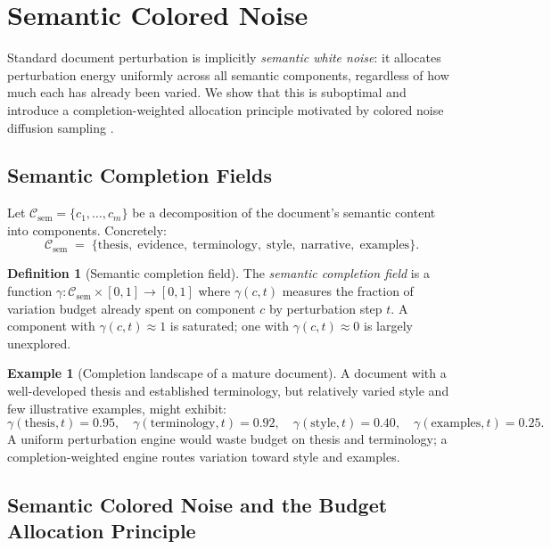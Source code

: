 \documentclass[12pt, a4paper]{article}
\theoremstyle{plain}
\theoremstyle{definition}
\newtheorem{definition}[theorem]{Definition}
\newtheorem{example}[theorem]{Example}
\theoremstyle{remark}
\begin{document}
\section{Semantic Colored Noise}
\label{sec:colorednoise}

Standard document perturbation is implicitly \emph{semantic white noise}: it
allocates perturbation energy uniformly across all semantic components,
regardless of how much each has already been varied.  We show that this
is suboptimal and introduce a completion-weighted allocation principle
motivated by colored noise diffusion sampling
\cite{davidson2026colorednoisediffusionsampling}.

\subsection{Semantic Completion Fields}

Let $\mathcal{C}_{\mathrm{sem}} = \{c_1, \ldots, c_m\}$ be a decomposition of
the document's semantic content into components.  Concretely:
\[
   \mathcal{C}_{\mathrm{sem}} \;=\;
   \{\text{thesis},\; \text{evidence},\; \text{terminology},\;
     \text{style},\; \text{narrative},\; \text{examples}\}.
\]

\begin{definition}[Semantic completion field]
\label{def:completion}
The \emph{semantic completion field} is a function
$\gamma : \mathcal{C}_{\mathrm{sem}} \times [0,1] \to [0,1]$
where $\gamma(c, t)$ measures the fraction of variation budget already spent
on component $c$ by perturbation step $t$.  A component with
$\gamma(c, t) \approx 1$ is saturated; one with $\gamma(c, t) \approx 0$ is
largely unexplored.
\end{definition}

\begin{example}[Completion landscape of a mature document]
A document with a well-developed thesis and established terminology, but
relatively varied style and few illustrative examples, might exhibit:
\[
   \gamma(\text{thesis}, t) = 0.95, \quad
   \gamma(\text{terminology}, t) = 0.92, \quad
   \gamma(\text{style}, t) = 0.40, \quad
   \gamma(\text{examples}, t) = 0.25.
\]
A uniform perturbation engine would waste budget on thesis and terminology;
a completion-weighted engine routes variation toward style and examples.
\end{example}

\subsection{Semantic Colored Noise and the Budget Allocation Principle}
\end{document}
